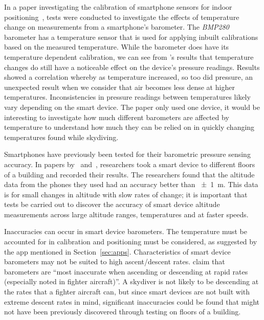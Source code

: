\documentclass[11pt, a4paper, twocolumn]{article}
\begin{document}
In a paper investigating the calibration of smartphone sensors for indoor positioning~\cite{keller_calibration_2012}, tests were conducted to investigate the effects of temperature change on measurements from a smartphone's barometer. The \textit{BMP280} barometer has a temperature sensor that is used for applying inbuilt calibrations based on the measured temperature. While the barometer does have its temperature dependent calibration, we can see from \citeauthor{keller_calibration_2012}'s results that temperature changes do still have a noticeable effect on the device's pressure readings. Results showed a correlation whereby as temperature increased, so too did pressure, an unexpected result when we consider that air becomes less dense at higher temperatures. Inconsistencies in pressure readings between temperatures likely vary depending on the smart device. The paper only used one device, it would be interesting to investigate how much different barometers are affected by temperature to understand how much they can be relied on in quickly changing temperatures found while skydiving.

Smartphones have previously been tested for their barometric pressure sensing accuracy. In papers by~\textcite{keller_calibration_2012} and~\textcite{he_atmospheric_2012}, researchers took a smart device to different floors of a building and recorded their results. The researchers found that the altitude data from the phones they used had an accuracy better than \SI{\pm1}{\metre}. This data is for small changes in altitude with slow rates of change; it is important that tests be carried out to discover the accuracy of smart device altitude measurements across large altitude ranges, temperatures and at faster speeds.

Inaccuracies can occur in smart device barometers. The temperature must be accounted for in calibration and positioning must be considered, as suggested by the  app mentioned in Section~\ref{sec:apps}. Characteristics of smart device barometers may not be suited to high ascent/descent rates. \textcite{gray_integrated_1995} claim that barometers are ``most inaccurate when ascending or descending at rapid rates (especially noted in fighter aircraft)''. A skydiver is not likely to be descending at the rates that a fighter aircraft can, but since smart devices are not built with extreme descent rates in mind, significant inaccuracies could be found that might not have been previously discovered through testing on floors of a building.
\end{document}
